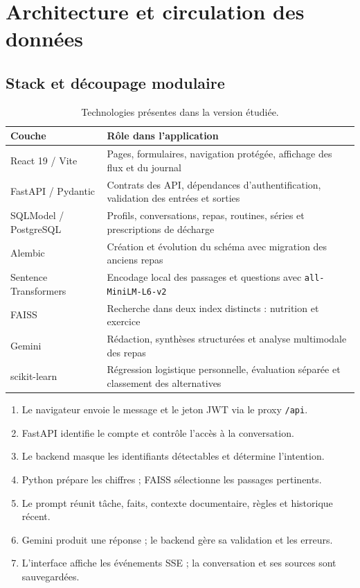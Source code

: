 \documentclass[11pt,a4paper]{article}
\begin{document}
\clearpage
\section{Architecture et circulation des données}
\subsection{Stack et découpage modulaire}
\begin{table}[H]
\small\begin{tabularx}{\linewidth}{p{3cm}X}
\toprule
\textbf{Couche} & \textbf{Rôle dans l'application} \\
\midrule
React 19 / Vite & Pages, formulaires, navigation protégée, affichage des flux et du journal \\
FastAPI / Pydantic & Contrats des API, dépendances d'authentification, validation des entrées et sorties \\
SQLModel / PostgreSQL & Profils, conversations, repas, routines, séries et prescriptions de décharge \\
Alembic & Création et évolution du schéma avec migration des anciens repas \\
Sentence Transformers & Encodage local des passages et questions avec \texttt{all-MiniLM-L6-v2} \\
FAISS & Recherche dans deux index distincts : nutrition et exercice \\
Gemini & Rédaction, synthèses structurées et analyse multimodale des repas \\
scikit-learn & Régression logistique personnelle, évaluation séparée et classement des alternatives \\
\bottomrule
\end{tabularx}
\caption{Technologies présentes dans la version étudiée.}
\end{table}

\begin{tcolorbox}[colback=lightgray,colframe=brandblue,title=Parcours d'une requête de coaching]
\begin{enumerate}[leftmargin=*,itemsep=0.35em]
\item Le navigateur envoie le message et le jeton JWT via le proxy \texttt{/api}.
\item FastAPI identifie le compte et contrôle l'accès à la conversation.
\item Le backend masque les identifiants détectables et détermine l'intention.
\item Python prépare les chiffres ; FAISS sélectionne les passages pertinents.
\item Le prompt réunit tâche, faits, contexte documentaire, règles et historique récent.
\item Gemini produit une réponse ; le backend gère sa validation et les erreurs.
\item L'interface affiche les événements SSE ; la conversation et ses sources sont sauvegardées.
\end{enumerate}
\end{tcolorbox}
\end{document}
